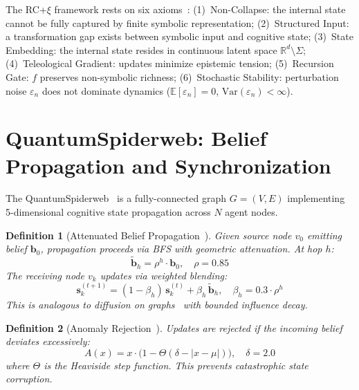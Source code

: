 \documentclass[conference]{IEEEtran}
\newtheorem{definition}{Definition}
\begin{document}
The RC+$\xi$ framework rests on six axioms~\cite{harrison2026codettefull}: (1)~Non-Collapse: the internal state cannot be fully captured by finite symbolic representation; (2)~Structured Input: a transformation gap exists between symbolic input and cognitive state; (3)~State Embedding: the internal state resides in continuous latent space $\mathbb{R}^d \setminus \Sigma$; (4)~Teleological Gradient: updates minimize epistemic tension; (5)~Recursion Gate: $f$ preserves non-symbolic richness; (6)~Stochastic Stability: perturbation noise $\varepsilon_n$ does not dominate dynamics ($\mathbb{E}[\varepsilon_n] = 0$, $\text{Var}(\varepsilon_n) < \infty$).

\section{QuantumSpiderweb: Belief Propagation and Synchronization}
\label{sec:spiderweb}

The QuantumSpiderweb~\cite{harrison2026codettefull,harrison2025citizenscience} is a fully-connected graph $G = (V, E)$ implementing 5-dimensional cognitive state propagation across $N$ agent nodes.

\begin{definition}[Attenuated Belief Propagation~\cite{harrison2026codettefull}]
\label{def:belief}
Given source node $v_0$ emitting belief $\mathbf{b}_0$, propagation proceeds via BFS with geometric attenuation. At hop $h$:
\begin{equation}
  \tilde{\mathbf{b}}_h = \rho^h \cdot \mathbf{b}_0, \quad \rho = 0.85
  \label{eq:attenuation}
\end{equation}
The receiving node $v_k$ updates via weighted blending:
\begin{equation}
  \mathbf{s}_k^{(t+1)} = (1 - \beta_h)\,\mathbf{s}_k^{(t)} + \beta_h\,\tilde{\mathbf{b}}_h, \quad \beta_h = 0.3 \cdot \rho^h
  \label{eq:belief_blend}
\end{equation}
This is analogous to diffusion on graphs~\cite{olfatisaber2007consensus} with bounded influence decay.
\end{definition}

\begin{definition}[Anomaly Rejection~\cite{harrison2026codettefull}]
\label{def:anomaly}
Updates are rejected if the incoming belief deviates excessively:
\begin{equation}
  A(x) = x \cdot \bigl(1 - \Theta(\delta - |x - \mu|)\bigr), \quad \delta = 2.0
  \label{eq:anomaly}
\end{equation}
where $\Theta$ is the Heaviside step function. This prevents catastrophic state corruption.
\end{definition}
\end{document}
